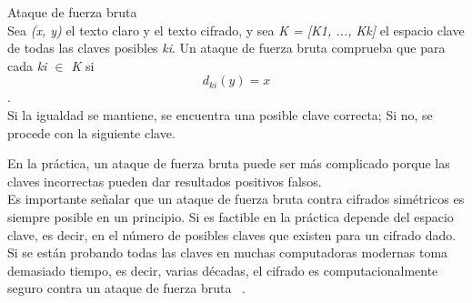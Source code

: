 \begin{definition} 
Ataque de fuerza bruta\\
Sea \textit{(x, y)} el texto claro y el texto cifrado, y sea \textit{K = [K1, ..., Kk]} el espacio clave de todas las claves posibles \textit{ki}. Un ataque de fuerza bruta comprueba que para cada \textit{ki $\in$ K} si \\
\textit{ \[d_{ki}(y) = x\] }.\\
Si la igualdad se mantiene, se encuentra una posible clave correcta; Si no, se procede con la siguiente clave.\\
\end{definition}
En la práctica, un ataque de fuerza bruta puede ser más complicado porque las claves incorrectas pueden dar resultados positivos falsos. \\
Es importante señalar que un ataque de fuerza bruta contra cifrados simétricos es siempre posible en un principio. Si es factible en la práctica depende del espacio clave, es decir, en el número de posibles claves que existen para un cifrado dado. Si se están probando todas las claves en muchas computadoras modernas toma demasiado tiempo, es decir, varias décadas, el cifrado es computacionalmente seguro contra un ataque de fuerza bruta ~\cite{paar}.\\





